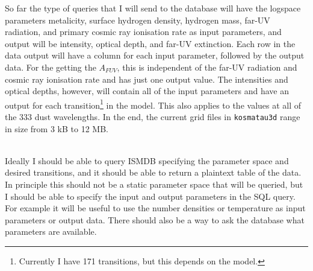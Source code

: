 \documentclass[a4paper]{article}
\newcommand{\kttd}{\texttt{kosmatau3d}}
\begin{document}
    So far the type of queries that I will send to the database will have the logspace parameters metalicity, surface hydrogen density, hydrogen mass, far-UV radiation, and primary cosmic ray ionisation rate as input parameters, and output will be intensity, optical depth, and far-UV extinction.
    Each row in the data output will have a column for each input parameter, followed by the output data.
    For the getting the \(A_{FUV}\), this is independent of the far-UV radiation and cosmic ray ionisation rate and has just one output value.
    The intensities and optical depths, however, will contain all of the input parameters and have an output for each transition\footnote{Currently I have 171 transitions, but this depends on the model.} in the model.
    This also applies to the values at all of the 333 dust wavelengths.
    In the end, the current grid files in {\kttd} range in size from 3 kB to 12 MB.%
    
    \hfill \\
    
    Ideally I should be able to query ISMDB specifying the parameter space and desired transitions, and it should be able to return a plaintext table of the data.
    In principle this should not be a static parameter space that will be queried, but I should be able to specify the input and output parameters in the SQL query.
    For example it will be useful to use the number densities or temperature as input parameters or output data.
    There should also be a way to ask the database what parameters are available.%
    
\end{document}
